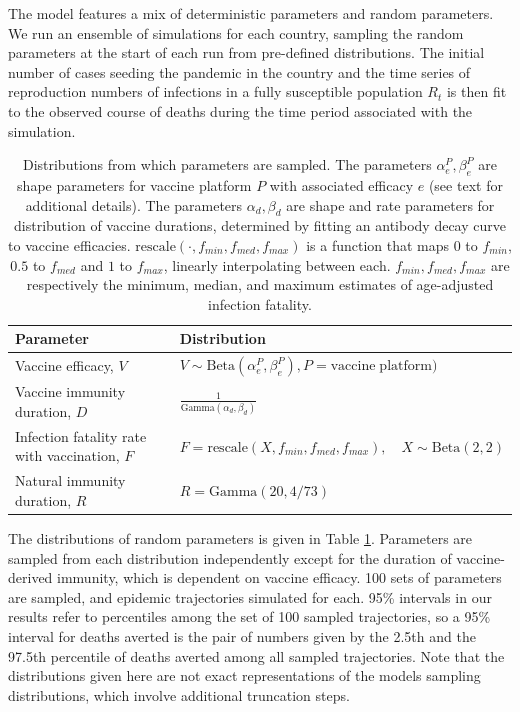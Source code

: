 \documentclass{article}
\begin{document}
The model features a mix of deterministic parameters and random parameters. We run an ensemble of simulations for each country, sampling the random parameters at the start of each run from pre-defined distributions. The initial number of cases seeding the pandemic in the country and the time series of reproduction numbers of infections in a fully susceptible population \(R_t\) is then fit to the observed course of deaths during the time period associated with the simulation.

\begin{table}

\caption{\label{tab:trajectory-sampling-parameters}Distributions from which parameters are sampled. The parameters $\alpha_e^P, \beta_e^P$ are shape parameters for vaccine platform $P$ with associated efficacy $e$ (see text for additional details). The parameters $\alpha_d, \beta_d$ are shape and rate parameters for distribution of vaccine durations, determined by fitting an antibody decay curve to vaccine efficacies. $\mathrm{rescale}(\cdot, f_{min}, f_{med}, f_{max})$ is a function that maps $0$ to $f_{min}$, $0.5$ to $f_{med}$ and $1$ to $f_{max}$, linearly interpolating between each. $f_{min}, f_{med}, f_{max}$ are respectively the minimum, median, and maximum estimates of age-adjusted infection fatality.}
\centering
\begin{tabular}[t]{ll}
\toprule
Parameter & Distribution\\
\midrule
Vaccine efficacy, $V$ & $V\sim \mathrm{Beta}(\alpha_{e}^P, \beta_{e}^P), P = \mathrm{vaccine\; platform})$\\
Vaccine immunity duration, $D$ & $\frac{1}{\mathrm{Gamma}(\alpha_{d}, \beta_d)}$\\
Infection fatality rate with vaccination, $F$ & $F = \mathrm{rescale}(X,f_{min}, f_{med}, f_{max}), \quad X\sim \mathrm{Beta}(2,2)$\\
Natural immunity duration, $R$ & $R = \mathrm{Gamma}(20, 4/73)$\\
\bottomrule
\end{tabular}
\end{table}

The distributions of random parameters is given in Table \ref{tab:trajectory-sampling-parameters}. Parameters are sampled from each distribution independently except for the duration of vaccine-derived immunity, which is dependent on vaccine efficacy. 100 sets of parameters are sampled, and epidemic trajectories simulated for each. 95\% intervals in our results refer to percentiles among the set of 100 sampled trajectories, so a 95\% interval for deaths averted is the pair of numbers given by the 2.5th and the 97.5th percentile of deaths averted among all sampled trajectories. Note that the distributions given here are not exact representations of the models sampling distributions, which involve additional truncation steps.
\end{document}
